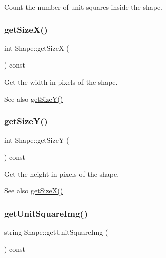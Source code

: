 Count the number of unit squares inside the shape. 

\mbox{\label{class_shape_ab01274fed67639da2080f73db0fc8f20}} 
\subsubsection{\texorpdfstring{get\+Size\+X()}{getSizeX()}}
{\footnotesize\ttfamily int Shape\+::get\+SizeX (\begin{DoxyParamCaption}{ }\end{DoxyParamCaption}) const\hspace{0.3cm}{\ttfamily [inline]}}



Get the width in pixels of the shape. 

\begin{DoxySeeAlso}{See also}
\mbox{\hyperlink{class_shape_a487dee28fa84cab6282eb16a95f91c68}{get\+Size\+Y()}} 
\end{DoxySeeAlso}
\mbox{\label{class_shape_a487dee28fa84cab6282eb16a95f91c68}} 
\subsubsection{\texorpdfstring{get\+Size\+Y()}{getSizeY()}}
{\footnotesize\ttfamily int Shape\+::get\+SizeY (\begin{DoxyParamCaption}{ }\end{DoxyParamCaption}) const\hspace{0.3cm}{\ttfamily [inline]}}



Get the height in pixels of the shape. 

\begin{DoxySeeAlso}{See also}
\mbox{\hyperlink{class_shape_ab01274fed67639da2080f73db0fc8f20}{get\+Size\+X()}} 
\end{DoxySeeAlso}
\mbox{\label{class_shape_a392209d780a35dbf8e2311ce02121bde}} 
\subsubsection{\texorpdfstring{get\+Unit\+Square\+Img()}{getUnitSquareImg()}}
{\footnotesize\ttfamily string Shape\+::get\+Unit\+Square\+Img (\begin{DoxyParamCaption}{ }\end{DoxyParamCaption}) const\hspace{0.3cm}{\ttfamily [inline]}}



